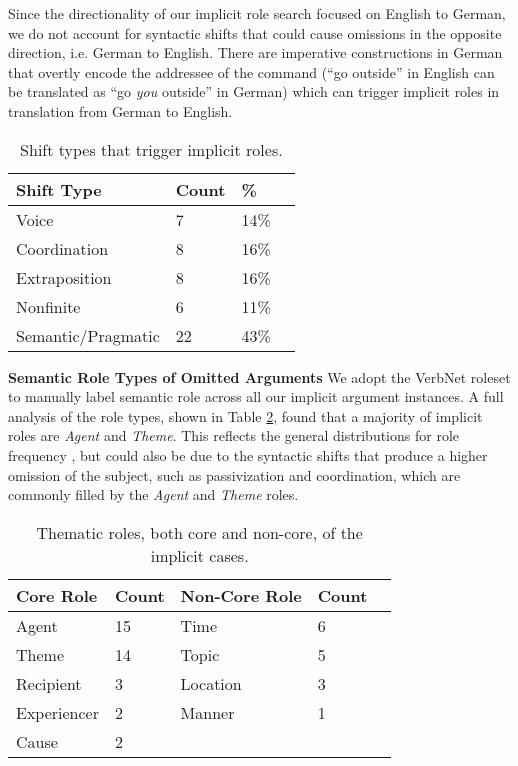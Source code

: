 \documentclass[11pt]{article}
\begin{document}
Since the directionality of our implicit role search focused on English to German, we do not account for syntactic shifts that could cause omissions in the opposite direction, i.e. German to English. There are imperative constructions in German that overtly encode the addressee of the command (``go outside'' in English can be translated as ``go \textit{you} outside'' in German) which can trigger implicit roles in translation from German to English.

\begin{table}[h]
\centering
\begin{tabular}{lllr}
\hline
\cline{1-3}
\small
Shift Type  & \small Count &  {\%} \\
\hline
\small Voice     & \small 7 & \small 14{\%}      \\
\small Coordination   & \small 8 &  \small 16{\%}     \\
\small Extraposition & \small 8 &  \small 16{\%}     \\
\small Nonfinite    & \small 6 & \small 11{\%}       \\
\small Semantic/Pragmatic  & \small 22 &  \small 43{\%}       \\
\hline
\end{tabular}
\caption{Shift types that trigger implicit roles.}\label{tab:accents}
\label{shifts}
\end{table}

{\bf  \flushleft Semantic Role Types of Omitted Arguments}
We adopt the VerbNet roleset \cite{kipper2000class} to manually label semantic role across all our implicit argument instances. A full analysis of the role types, shown in Table \ref{roles}, found that a majority of implicit roles are \textit{Agent} and \textit{Theme}. This reflects the general distributions for role frequency \cite{merlo2009abstraction}, but could also be due to the syntactic shifts that produce a higher omission of the subject, such as passivization and coordination, which are commonly filled by the \textit{Agent} and \textit{Theme} roles.

\begin{table}[h]
	\centering
	\begin{tabular}{llllr}
		\hline
		\cline{1-4}
		\small Core Role  & \small Count  & \small Non-Core Role & \small Count\\
		\hline
		\small Agent     & \small 15     & \small Time & \small 6 \\
		\small Theme   & \small 14     & \small Topic & \small 5 \\
		\small Recipient & \small 3      & \small Location & \small 3 \\
		\small Experiencer  & \small 2    & \small Manner & \small 1\\
		\small Cause    & \small 2    & & \\
		\hline
	\end{tabular}
	\caption{Thematic roles, both core and non-core, of the implicit cases.}\label{tab:accents}
	\label{roles}
\end{table}
\end{document}
